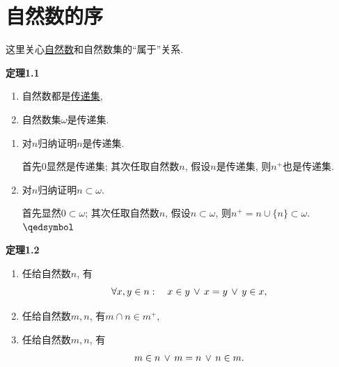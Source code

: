 


\setlength{\abovedisplayskip}{1pt}
\setlength{\belowdisplayskip}{1pt}

\section{自然数的序}

这里关心\href{01 自然数#nameddest=sec:定义1.3}{自然数}和自然数集的``属于''关系.

\vspace{10pt}

\hypertarget{sec:定理1.1}{}
\noindent\textbf{定理1.1}

\begin{enumerate}
    \item 自然数都是\href{02 传递集#nameddest=sec:定义1.1}{传递集},
    \item 自然数集$\omega$是传递集.
\end{enumerate}


\begin{enumerate}
    \item 对$n$归纳证明$n$是传递集.
    
    \hspace{2.17em}
    首先$0$显然是传递集; 其次任取自然数$n$, 假设$n$是传递集,
    则$n^+$也是传递集.

    \item 对$n$归纳证明$n\subset\omega$.
    
    \hspace{2.17em}
    首先显然$0\subset\omega$; 其次任取自然数$n$, 假设$n\subset\omega$,
    则$n^+=n\cup\{n\}\subset\omega$. \hfill $\qedsymbol$
\end{enumerate}

\vspace{10pt}

\hypertarget{sec:定理1.2}{}
\noindent\textbf{定理1.2}

\begin{enumerate}
    \item 任给自然数$n$, 有
    \[
        \forall x,y\in n:\quad x\in y\,\lor\,x=y\,\lor\,y\in x,\\[-6pt]
    \]
    \item 任给自然数$m,n$, 有$m\cap n\in m^+$,
    \item 任给自然数$m,n$, 有
    \[
        m\in n\,\lor\,m=n\,\lor\,n\in m.\\[-3pt]
    \]
\end{enumerate}

